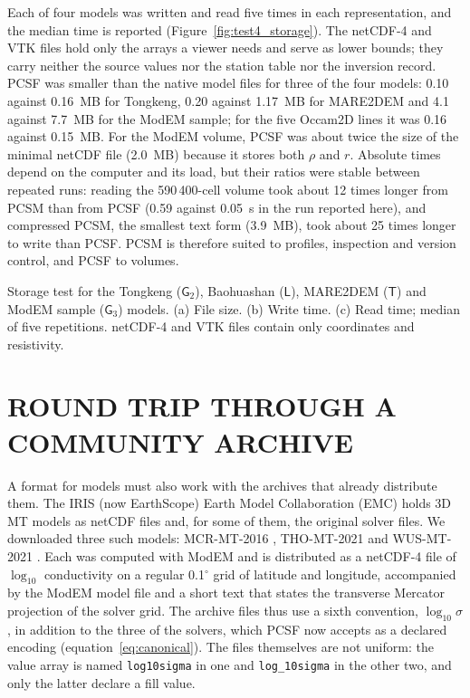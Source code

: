 \documentclass[manuscript]{geophysics}
\newcommand{\code}[1]{\texttt{#1}}
\newcommand{\Gtwo}{\mathsf{G}_{2}}
\newcommand{\Gthree}{\mathsf{G}_{3}}
\newcommand{\Mtri}{\mathsf{T}}
\newcommand{\Lset}{\mathsf{L}}
\begin{document}
Each of four models was written and read five times in each
representation, and the median time is reported
(Figure~\ref{fig:test4_storage}). The netCDF-4 and VTK files hold only
the arrays a viewer needs and serve as lower bounds; they carry
neither the source values nor the station table nor the inversion
record.
PCSF was smaller than the native model files for three of the four
models: 0.10 against 0.16~MB for Tongkeng, 0.20 against 1.17~MB for
MARE2DEM and 4.1 against 7.7~MB for the ModEM sample; for the five
Occam2D lines it was 0.16 against 0.15~MB. For the ModEM volume, PCSF
was about twice the size of the minimal netCDF file (2.0~MB) because it
stores both $\rho$ and $r$. Absolute times depend on the computer and
its load, but their ratios were stable between repeated runs: reading
the 590\,400-cell volume took about 12 times longer from PCSM than
from PCSF (0.59 against 0.05~s in the run reported here), and
compressed PCSM, the smallest text form (3.9~MB), took about 25 times
longer to write than PCSF. PCSM is therefore suited to profiles,
inspection and version control, and PCSF to volumes.

{Storage test for the Tongkeng ($\Gtwo$), Baohuashan
($\Lset$), MARE2DEM ($\Mtri$) and ModEM sample ($\Gthree$)
models. (a) File size. (b) Write time. (c) Read time; median of five
repetitions. netCDF-4 and VTK files contain only coordinates and
resistivity.}

\section{ROUND TRIP THROUGH A COMMUNITY ARCHIVE}

A format for models must also work with the archives that already
distribute them. The IRIS (now EarthScope) Earth Model Collaboration
(EMC) holds 3D MT models as netCDF files and, for some of them, the
original solver files. We downloaded three such models: MCR-MT-2016
\citep{Bedrosian2016,EMC_MCR}, THO-MT-2021
\citep{Bedrosian2021,EMC_THO} and WUS-MT-2021
\citep{Murphy2021,EMC_WUS}. Each was computed with ModEM and is
distributed as a netCDF-4 file of $\log_{10}$ conductivity on a regular
0.1$^\circ$ grid of latitude and longitude, accompanied by the ModEM
model file and a short text that states the transverse Mercator
projection of the solver grid. The archive files thus use a sixth
convention, $\log_{10}\sigma$, in addition to the three of the solvers,
which PCSF now accepts as a declared encoding
(equation~\ref{eq:canonical}). The files themselves are not uniform:
the value array is named \code{log10sigma} in one and
\code{log\_10sigma} in the other two, and only the latter declare a
fill value.
\end{document}
